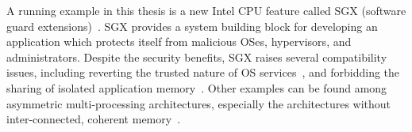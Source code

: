 





A running example in this thesis %
is a new Intel CPU feature called SGX (software guard extensions)~\cite{intelsgx}.
SGX provides a system building block for developing
an application which protects itself from malicious OSes, hypervisors, and administrators.
Despite the security benefits,
SGX raises several compatibility issues, including reverting the trusted nature of OS services~\cite{baumann14haven,osdi16scone,tsai17graphene-sgx}, and forbidding the sharing of isolated application memory~\cite{shinde17panoply}.
Other examples can be found among asymmetric multi-processing architectures,
especially the architectures without inter-connected, coherent memory~\cite{gschwind2007,cascaval2002evaluation}. 



